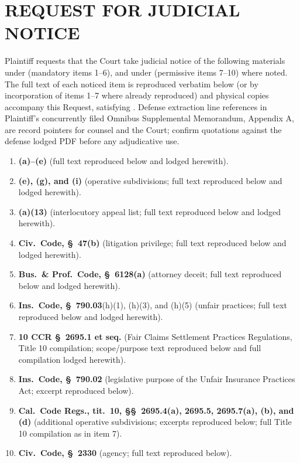 \newcommand{\docshorttitle}{RJN SUPPLEMENTAL --- \S\S~425.17 / 425.16 / 904.1 / 47 / 6128 / 790.03 / 10 CCR (802)}
\newcommand{\doctitleblock}{REQUEST FOR JUDICIAL NOTICE (SUPPLEMENTAL)}
\newcommand{\docsubblock}{(Evid.\ Code, \S\S~451(a), 452(b), 453; lodge with Notice of Lodging dated Apr.\ 30, 2026)}




\section*{REQUEST FOR JUDICIAL NOTICE}

Plaintiff requests that the Court take judicial notice of the following materials under  (mandatory items 1--6), and under  (permissive items 7--10) where noted. The full text of each noticed item is reproduced verbatim below (or by incorporation of items 1--7 where already reproduced) and physical copies accompany this Request, satisfying . Defense extraction line references in Plaintiff's concurrently filed Omnibus Supplemental Memorandum, Appendix A, are record pointers for counsel and the Court; confirm quotations against the defense lodged PDF before any adjudicative use.

\begin{enumerate}
\tightlist
\item \textbf{(a)--(e)} (full text reproduced below and lodged herewith).
\item \textbf{(e), (g), and (i)} (operative subdivisions; full text reproduced below and lodged herewith).
\item \textbf{(a)(13)} (interlocutory appeal list; full text reproduced below and lodged herewith).
\item \textbf{Civ.\ Code, \S~47(b)} (litigation privilege; full text reproduced below and lodged herewith).
\item \textbf{Bus.\ \& Prof.\ Code, \S~6128(a)} (attorney deceit; full text reproduced below and lodged herewith).
\item \textbf{Ins.\ Code, \S~790.03}(h)(1), (h)(3), and (h)(5) (unfair practices; full text reproduced below and lodged herewith).
\item \textbf{10 CCR \S~2695.1 et seq.} (Fair Claims Settlement Practices Regulations, Title 10 compilation; scope/purpose text reproduced below and full compilation lodged herewith).
\item \textbf{Ins.\ Code, \S~790.02} (legislative purpose of the Unfair Insurance Practices Act; excerpt reproduced below).
\item \textbf{Cal.\ Code Regs., tit.\ 10, \S\S~2695.4(a), 2695.5, 2695.7(a), (b), and (d)} (additional operative subdivisions; excerpts reproduced below; full Title 10 compilation as in item 7).
\item \textbf{Civ.\ Code, \S~2330} (agency; full text reproduced below).
\end{enumerate}

